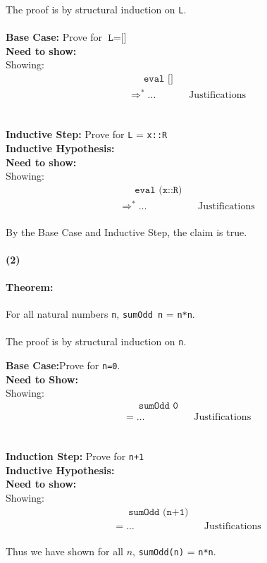 \documentclass[11pt]{article}
\renewcommand{\part}[1] {\vspace{.10in} {\bf (#1)}}
\newcommand{\sml}[1]{\texttt{#1}}
\newcommand{\step}{\ensuremath{\Rightarrow}}
\newcommand{\stepstar}{\ensuremath{\step ^*}}
\begin{document}
\noindent The proof is by structural induction on \sml{L}.\\\\
\textbf{Base Case:} \quad  Prove for $\sml{L}=\sml{[]}$\\
\textbf{Need to show:} \\
Showing:
\begin{align*}
&\quad\;\;  \sml{eval []}\\
& \stepstar \ldots && \text{Justifications}
\end{align*}
\\\\
\textbf{Inductive Step:} \quad Prove for \sml{L} = \sml{x::R}\\
\textbf{Inductive Hypothesis:} \\
\textbf{Need to show:} \\
Showing:
\begin{align*}
&\quad\;\; \sml{eval (x::R)}\\ 
& \stepstar \ldots && \text{Justifications}
\end{align*}
\\
By the Base Case and Inductive Step, the claim is true.\\\\

\noindent\part{2}\\
\paragraph{Theorem:} 
For all natural numbers \sml{n}, \sml{sumOdd n} = \sml{n*n}.\\\\

\noindent The proof is by structural induction on \sml{n}.

\noindent\textbf{Base Case:}\quad Prove for \sml{n=0}.\\
\textbf{Need to Show:} \\
Showing:
\begin{align*}
&\quad\;\;  \sml{sumOdd 0}\\
&= \ldots && \text{Justifications}
\end{align*}
\\\\
\noindent\textbf{Induction Step:} \quad Prove for \sml{n+1}\\
\textbf{Inductive Hypothesis:} \\
\textbf{Need to show:} \\
Showing:
\begin{align*}
&\quad\;\;  \sml{sumOdd (n+1)}\\
&= \ldots && \text{Justifications}
\end{align*}
\\
Thus we have shown for all $n$, \sml{sumOdd(n)} = \sml{n*n}.\\
\end{document}
